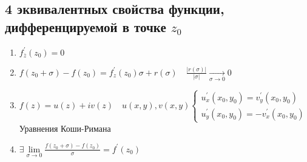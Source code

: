 \documentclass[main]{subfiles}
\begin{document}
\subsection{4 эквивалентных свойства функции, дифференцируемой в точке $z_0$}
    \begin{enumerate}
        \item $f^\prime_{\overline{z}} (z_0) = 0 $
        \item $f(z_0 + \sigma) - f(z_0) = f^\prime_z(z_0) \sigma + r(\sigma) \quad \frac{|r(\sigma)|}{|\sigma|} \underset{\sigma \to 0}{\longrightarrow} 0 $
        \item $f(z) = u(z) + iv(z) \quad u(x,y), v(x,y) \begin{cases}
            u^\prime_x(x_0,y_0)  = v^\prime_y(x_0,y_0) \\
            u^\prime_y(x_0,y_0) = -v^\prime_x(x_0,y_0)
        \end{cases}$  Уравнения Коши-Римана
        \item $ \exists \underset{\sigma \to 0}{\lim} \frac{f(z_0 + \sigma) - f(z_0)}{\sigma} = f^\prime(z_0)$
    \end{enumerate}
\end{document}
